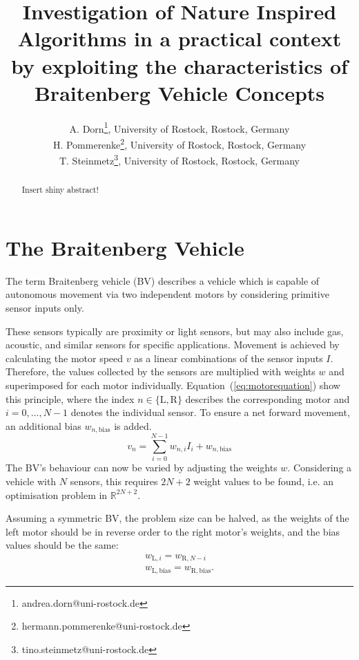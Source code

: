 \documentclass[a4paper]{jacow}
\begin{document}
\title{Investigation of Nature Inspired Algorithms in a practical context by exploiting the characteristics of Braitenberg Vehicle Concepts}

\author{A. Dorn\thanks{andrea.dorn@uni-rostock.de}, University of Rostock, Rostock, Germany \\
		H. Pommerenke\thanks{hermann.pommerenke@uni-rostock.de}, University of Rostock, Rostock, Germany \\
		T. Steinmetz\thanks{tino.steinmetz@uni-rostock.de}, University of Rostock, Rostock, Germany}
	
\maketitle


\begin{abstract}
   Insert shiny abstract!
\end{abstract}

\section{The Braitenberg Vehicle}

The term Braitenberg vehicle (BV) describes a vehicle which is capable of autonomous movement via two independent motors by considering primitive sensor inputs only.

These sensors typically are proximity or light sensors, but may also include gas, acoustic, and similar sensors for specific applications. Movement is achieved by calculating the motor speed $v$ as a linear combinations of the sensor inputs $I$. Therefore, the values collected by the sensors are multiplied with weights $w$ and superimposed for each motor individually. Equation~(\ref{eq:motorequation}) show this principle, where the index $n\in\{\mathrm{L},\mathrm{R}\}$ describes the corresponding motor and $i=0,\ldots,N-1$ denotes the individual sensor. To ensure a net forward movement, an additional bias $w_{n,\text{bias}}$ is added.
\begin{equation}
	v_{n} = \sum\limits_{i=0}^{N-1} w_{n,i} I_{i} + w_{n,\text{bias}}
	\label{eq:motorequation}
\end{equation}
The BV's behaviour can now be varied by adjusting the weights $w$. Considering a vehicle with $N$ sensors, this requires $2N+2$ weight values to be found, i.e. an optimisation problem in $\mathbb{R}^{2N+2}$.

Assuming a symmetric BV, the problem size can be halved, as the weights of the left motor should be in reverse order to the right motor's weights, and the bias values should be the same:
\begin{align}
	w_{\mathrm{L}, i} = w_{\mathrm{R}, N-i} \nonumber \\
	w_{\mathrm{L},\text{bias}} = w_{\mathrm{R},\text{bias}}.\label{eq:symmetry}
\end{align}
\end{document}

